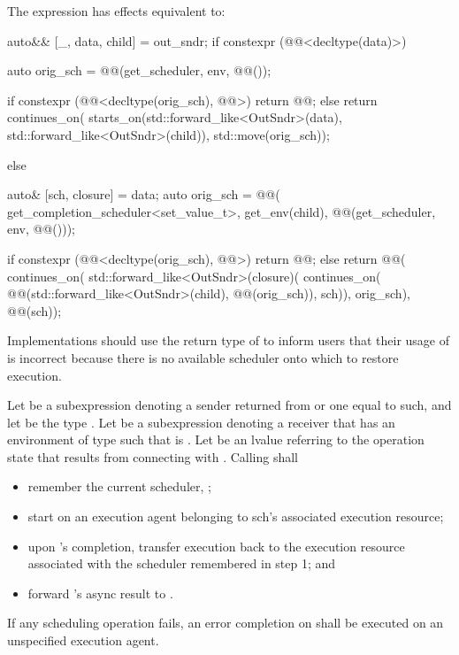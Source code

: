 \pnum
The expression 
has effects equivalent to:
\begin{codeblock}
auto&& [_, data, child] = out_sndr;
if constexpr (@@<decltype(data)>) {
  auto orig_sch =
    @@(get_scheduler, env, @@());

  if constexpr (@@<decltype(orig_sch), @@>) {
    return @@{};
  } else {
    return continues_on(
      starts_on(std::forward_like<OutSndr>(data), std::forward_like<OutSndr>(child)),
      std::move(orig_sch));
  }
} else {
  auto& [sch, closure] = data;
  auto orig_sch = @@(
    get_completion_scheduler<set_value_t>,
    get_env(child),
    @@(get_scheduler, env, @@()));

  if constexpr (@@<decltype(orig_sch), @@>) {
    return @@{};
  } else {
    return @@(
      continues_on(
        std::forward_like<OutSndr>(closure)(
          continues_on(
            @@(std::forward_like<OutSndr>(child), @@(orig_sch)),
            sch)),
        orig_sch),
      @@(sch));
  }
}
\end{codeblock}

\pnum
\recommended
Implementations should use
the return type of 
to inform users that their usage of  is incorrect
because there is no available scheduler onto which to restore execution.

\pnum
Let  be a subexpression denoting
a sender returned from  or one equal to such, and
let  be the type .
Let  be a subexpression denoting a receiver
that has an environment of type 
such that  is .
Let  be an lvalue referring to the operation state
that results from connecting  with .
Calling  shall
\begin{itemize}
\item
remember the current scheduler, ;
\item
start  on an execution agent belonging to
sch's associated execution resource;
\item
upon 's completion,
transfer execution back to the execution resource
associated with the scheduler remembered in step 1; and
\item
forward 's async result to .
\end{itemize}
If any scheduling operation fails,
an error completion on  shall be executed
on an unspecified execution agent.

